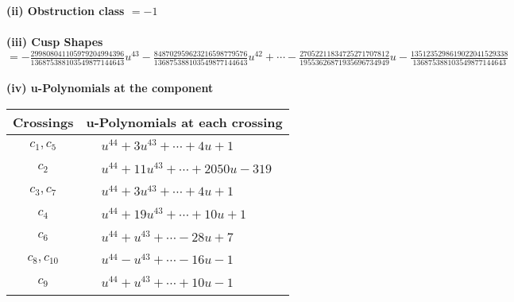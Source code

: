 \documentclass[1p]{elsarticle_modified}
\theoremstyle{definition}
\begin{document}
\flushleft \textbf{(ii) Obstruction class $= -1$}\\~\\
\flushleft \textbf{(iii) Cusp Shapes $= -\frac{299808041105979204994396}{136875388103549877144643} u^{43}-\frac{848702959623216598779576}{136875388103549877144643} u^{42}+\cdots-\frac{27052211834725271707812}{19553626871935696734949} u-\frac{1351235298619022041529338}{136875388103549877144643}$}\\~\\
\newpage\renewcommand{\arraystretch}{1}
\flushleft \textbf{(iv) u-Polynomials at the component}\newline \\
\begin{tabular}{m{50pt}|m{274pt}}
Crossings & \hspace{64pt}u-Polynomials at each crossing \\
\hline $$\begin{aligned}c_{1},c_{5}\end{aligned}$$&$\begin{aligned}
&u^{44}+3 u^{43}+\cdots+4 u+1
\end{aligned}$\\
\hline $$\begin{aligned}c_{2}\end{aligned}$$&$\begin{aligned}
&u^{44}+11 u^{43}+\cdots+2050 u-319
\end{aligned}$\\
\hline $$\begin{aligned}c_{3},c_{7}\end{aligned}$$&$\begin{aligned}
&u^{44}+3 u^{43}+\cdots+4 u+1
\end{aligned}$\\
\hline $$\begin{aligned}c_{4}\end{aligned}$$&$\begin{aligned}
&u^{44}+19 u^{43}+\cdots+10 u+1
\end{aligned}$\\
\hline $$\begin{aligned}c_{6}\end{aligned}$$&$\begin{aligned}
&u^{44}+u^{43}+\cdots-28 u+7
\end{aligned}$\\
\hline $$\begin{aligned}c_{8},c_{10}\end{aligned}$$&$\begin{aligned}
&u^{44}- u^{43}+\cdots-16 u-1
\end{aligned}$\\
\hline $$\begin{aligned}c_{9}\end{aligned}$$&$\begin{aligned}
&u^{44}+u^{43}+\cdots+10 u-1
\end{aligned}$\\
\hline
\end{tabular}\\~\\
\end{document}
